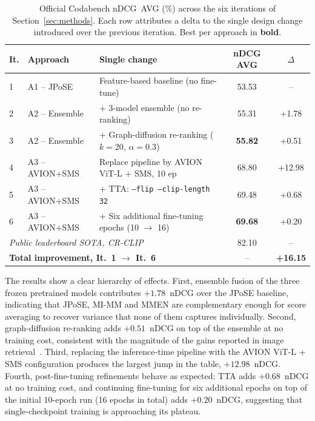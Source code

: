 \begin{table}[t]
\centering
\small
\caption{Official Codabench nDCG~AVG (\%) across the six iterations of Section~\ref{sec:methods}. Each row attributes a delta to the single design change introduced over the previous iteration. Best per approach in \textbf{bold}.}
\label{tab:iterations}
\setlength{\tabcolsep}{6pt}
\begin{tabular}{l l l c c}
\toprule
\textbf{It.} & \textbf{Approach} & \textbf{Single change} & \textbf{nDCG AVG} & $\Delta$ \\
\midrule
1 & A1 -- JPoSE      & Feature-based baseline (no fine-tune)             & 53.53 & --     \\[1pt]
\midrule
2 & A2 -- Ensemble   & + 3-model ensemble (no re-ranking)                & 55.31 & +1.78  \\
3 & A2 -- Ensemble   & + Graph-diffusion re-ranking ($k{=}20$, $\alpha{=}0.3$) & \textbf{55.82} & +0.51  \\
\midrule
4 & A3 -- AVION+SMS  & Replace pipeline by AVION ViT-L + SMS, 10 ep      & 68.80 & +12.98 \\
5 & A3 -- AVION+SMS  & + TTA: \texttt{--flip --clip-length 32}           & 69.48 & +0.68  \\
6 & A3 -- AVION+SMS  & + Six additional fine-tuning epochs (10 $\to$ 16) & \textbf{69.68} & +0.20  \\
\midrule
\multicolumn{3}{l}{\textit{Public leaderboard SOTA, CR-CLIP~\cite{he2025crclip}}}    & 82.10 & --     \\
\multicolumn{3}{l}{\textbf{Total improvement, It.\ 1 $\to$ It.\ 6}}                  & --    & \textbf{+16.15} \\
\bottomrule
\end{tabular}
\end{table}

The results show a clear hierarchy of effects. First, ensemble fusion of the three frozen pretrained models contributes $+1.78$~nDCG over the JPoSE baseline, indicating that JPoSE, MI-MM and MMEN are complementary enough for score averaging to recover variance that none of them captures individually. Second, graph-diffusion re-ranking adds $+0.51$~nDCG on top of the ensemble at no training cost, consistent with the magnitude of the gains reported in image retrieval~\cite{iscen2017diffusion}. Third, replacing the inference-time pipeline with the AVION ViT-L + SMS configuration produces the largest jump in the table, $+12.98$~nDCG. Fourth, post-fine-tuning refinements behave as expected: TTA adds $+0.68$~nDCG at no training cost, and continuing fine-tuning for six additional epochs on top of the initial 10-epoch run (16 epochs in total) adds $+0.20$~nDCG, suggesting that single-checkpoint training is approaching its plateau.

